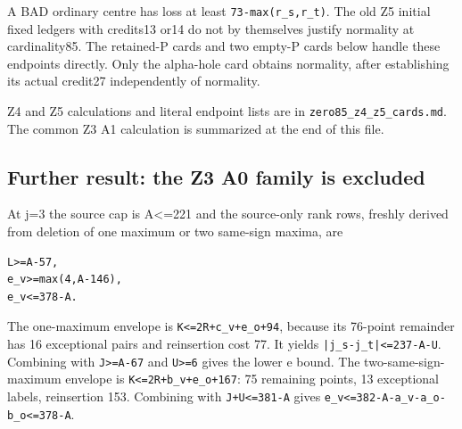 \documentclass[10pt,a4paper]{article}
\theoremstyle{definition}
\begin{document}
A BAD ordinary centre has loss at least
\texttt{73-max(r\_\allowbreak{}\allowbreak{}s,\allowbreak{}r\_\allowbreak{}\allowbreak{}t)}. The old Z5 initial fixed
ledgers with credits13 or14 do not by themselves justify normality at
cardinality85. The retained-P cards and two empty-P cards below handle
these endpoints directly. Only the alpha-hole card obtains normality,\allowbreak{}
after establishing its actual credit27 independently of normality.

Z4 and Z5 calculations and literal endpoint lists are in
\texttt{zero85\_\allowbreak{}\allowbreak{}z4\_\allowbreak{}\allowbreak{}z5\_\allowbreak{}\allowbreak{}cards.md}. The common Z3 A1
calculation is summarized at the end of this file.

\hypertarget{further-result-the-z3-a0-family-is-excluded}{%
\subsection{Further result: the Z3 A0 family is
excluded}\label{further-result-the-z3-a0-family-is-excluded}}

At j=\allowbreak{}3 the source cap is A\textless=\allowbreak{}221 and the source-only rank rows,\allowbreak{}
freshly derived from deletion of one maximum or two same-sign maxima,\allowbreak{}
are

\begin{lstlisting}
L>=A-57,
e_v>=max(4,A-146),
e_v<=378-A.
\end{lstlisting}

The one-maximum envelope is
\texttt{K<=\allowbreak{}2R+\allowbreak{}c\_\allowbreak{}\allowbreak{}v+\allowbreak{}e\_\allowbreak{}\allowbreak{}o+\allowbreak{}94},\allowbreak{} because its 76-point
remainder has 16 exceptional pairs and reinsertion cost 77. It yields
\texttt{|j\_\allowbreak{}\allowbreak{}s-j\_\allowbreak{}\allowbreak{}t|<=\allowbreak{}237-A-U}. Combining with
\texttt{J>=\allowbreak{}A-67} and \texttt{U>=\allowbreak{}6}
gives the lower e bound. The two-same-sign-maximum envelope is
\texttt{K<=\allowbreak{}2R+\allowbreak{}b\_\allowbreak{}\allowbreak{}v+\allowbreak{}e\_\allowbreak{}\allowbreak{}o+\allowbreak{}167}: 75 remaining points,\allowbreak{} 13
exceptional labels,\allowbreak{} reinsertion 153. Combining with
\texttt{J+\allowbreak{}U<=\allowbreak{}381-A} gives
\texttt{e\_\allowbreak{}\allowbreak{}v<=\allowbreak{}382-A-a\_\allowbreak{}\allowbreak{}v-a\_\allowbreak{}\allowbreak{}o-b\_\allowbreak{}\allowbreak{}o<=\allowbreak{}378-A}.
\end{document}
